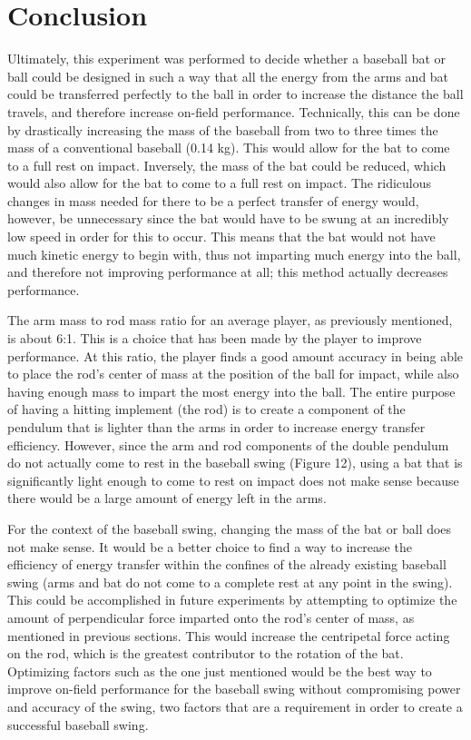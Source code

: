 \documentclass[%
 aip,
 amsmath,amssymb,
 reprint,%
 floatfix,%
]{revtex4-1}
\begin{document}
\section{\label{sec:level6}Conclusion}

Ultimately, this experiment was performed to decide whether a baseball bat or ball could be designed in such a way that all the energy from the arms and bat could be transferred perfectly to the ball in order to increase the distance the ball travels, and therefore increase on-field performance. Technically, this can be done by drastically increasing the mass of the baseball from two to three times the mass of a conventional baseball (0.14 kg). This would allow for the bat to come to a full rest on impact. Inversely, the mass of the bat could be reduced, which would also allow for the bat to come to a full rest on impact. The ridiculous changes in mass needed for there to be a perfect transfer of energy would, however, be unnecessary since the bat would have to be swung at an incredibly low speed in order for this to occur. This means that the bat would not have much kinetic energy to begin with, thus not imparting much energy into the ball, and therefore not improving performance at all; this method actually decreases performance.

The arm mass to rod mass ratio for an average player, as previously mentioned, is about 6:1. This is a choice that has been made by the player to improve performance. At this ratio, the player finds a good amount accuracy in being able to place the rod's center of mass at the position of the ball for impact, while also having enough mass to impart the most energy into the ball. The entire purpose of having a hitting implement (the rod) is to create a component of the pendulum that is lighter than the arms in order to increase energy transfer efficiency. However, since the arm and rod components of the double pendulum do not actually come to rest in the baseball swing (Figure 12), using a bat that is significantly light enough to come to rest on impact does not make sense because there would be a large amount of energy left in the arms.

For the context of the baseball swing, changing the mass of the bat or ball does not make sense. It would be a better choice to find a way to increase the efficiency of energy transfer within the confines of the already existing baseball swing (arms and bat do not come to a complete rest at any point in the swing). This could be accomplished in future experiments by attempting to optimize the amount of perpendicular force imparted onto the rod's center of mass, as mentioned in previous sections. This would increase the centripetal force acting on the rod, which is the greatest contributor to the rotation of the bat. Optimizing factors such as the one just mentioned would be the best way to improve on-field performance for the baseball swing without compromising power and accuracy of the swing, two factors that are a requirement in order to create a successful baseball swing.

\nocite{*}
\end{document}
